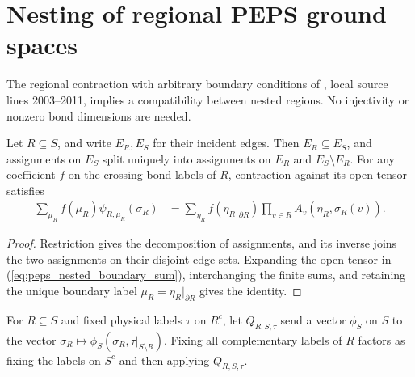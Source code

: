 \section{Nesting of regional PEPS ground spaces}%
\label{sec:peps_region_ground_space_nesting}

The regional contraction with arbitrary boundary conditions of
\cite[Section~IV.C.1]{Cirac2021Matrix}, local source lines 2003--2011,
implies a compatibility between nested regions. No injectivity or
nonzero bond dimensions are needed.

\begin{lemma}%
    \label{thm:peps_nested_incident_labels}
    \leanok
    Let $R\subseteq S$, and write $E_R,E_S$ for their incident
    edges. Then $E_R\subseteq E_S$, and assignments on $E_S$
    split uniquely into assignments on $E_R$ and $E_S\setminus E_R$.
    For any coefficient $f$ on the crossing-bond labels of $R$,
    contraction against its open tensor satisfies
    \begin{align}
        \sum_{\mu_R} f(\mu_R)\psi_{R,\mu_R}(\sigma_R)
         & =\sum_{\eta_R}f(\eta_R|_{\partial R})
        \prod_{v\in R} A_v(\eta_R,\sigma_R(v)).
        \label{eq:peps_nested_boundary_sum}
    \end{align}
\end{lemma}

\begin{proof}\leanok
    Restriction gives the decomposition of assignments, and its inverse
    joins the two assignments on their disjoint edge sets.
    Expanding the open tensor in
    (\ref{eq:peps_nested_boundary_sum}), interchanging the finite
    sums, and retaining the unique boundary label
    $\mu_R=\eta_R|_{\partial R}$ gives the identity.
\end{proof}

\begin{definition}%
    \label{def:peps_subregion_slice}
    \leanok
    For $R\subseteq S$ and fixed physical labels $\tau$ on $R^c$,
    let $Q_{R,S,\tau}$ send a vector $\phi_S$ on $S$ to the vector
    $\sigma_R\mapsto\phi_S(\sigma_R,\tau|_{S\setminus R})$.
    Fixing all complementary labels of $R$ factors as fixing the
    labels on $S^c$ and then applying $Q_{R,S,\tau}$.
\end{definition}

